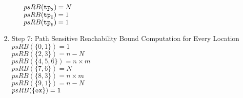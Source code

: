 \begin{enumerate}
\begin{itemize}
    $psRB(\mathtt{tp}_3) = N$ \\
    $psRB(\mathtt{tp}_0) = 1$ \\
    $psRB(\mathtt{tp}_6) = 1$ 
\end{itemize}
\item Step 7: Path Sensitive Reachability Bound Computation for Every Location
\\
$psRB(\{0, 1\}) = 1$ \\
$psRB(\{2, 3\}) = n - N$ \\
$psRB(\{4, 5, 6\}) = n \times m$ \\
$psRB(\{7, 6\}) = N$ \\
$psRB(\{8, 3\}) = n \times m$ \\
$psRB(\{9, 1\}) = n - N$ \\
$psRB(\{\mathtt{ex}\}) = 1$ 
\end{enumerate}
